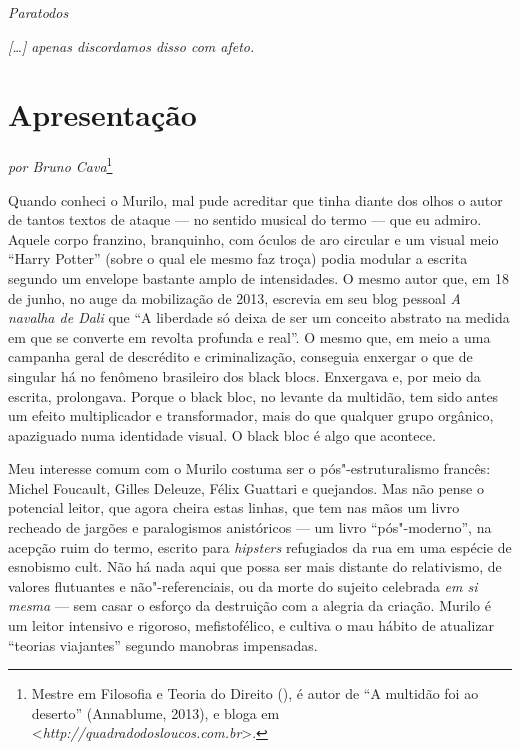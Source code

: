 \pagebreak

\vspace*{\fill}\thispagestyle{empty}
\begin{flushright}
\emph{Paratodos}
\end{flushright}
\pagebreak

\vspace*{\fill}\thispagestyle{empty}
\begin{flushright}
\emph{{[}\ldots{}{]} apenas discordamos disso com afeto.}
\end{flushright}

\chapter{Apresentação}

\begin{flushright}
\emph{por Bruno Cava}\footnote{Mestre em Filosofia e Teoria do Direito (), é autor de ``A multidão foi ao deserto'' (Annablume, 2013), e bloga em \textless{}\emph{http://quadradodosloucos.com.br}\textgreater{}.}
\end{flushright}

Quando conheci o Murilo, mal pude acreditar que tinha diante
dos olhos o autor de tantos textos de ataque --- no sentido musical do
termo --- que eu admiro. Aquele corpo franzino, branquinho, com óculos de
aro circular e um visual meio ``Harry Potter'' (sobre o qual ele mesmo faz
troça) podia modular a escrita segundo um envelope bastante amplo de
intensidades. O mesmo autor que, em 18 de junho, no auge da
mobilização de 2013, escrevia em seu blog pessoal \emph{A navalha de
Dali} que ``A liberdade só deixa de ser um conceito abstrato na medida em
que se converte em revolta profunda e real''. O mesmo que, em meio a uma
campanha geral de descrédito e criminalização, conseguia enxergar o que
de singular há no fenômeno brasileiro dos black blocs. Enxergava e, por
meio da escrita, prolongava. Porque o black bloc, no levante da
multidão, tem sido antes um efeito multiplicador e transformador, mais do que
qualquer grupo orgânico, apaziguado numa identidade visual. O black bloc
é algo que acontece.

Meu interesse comum com o Murilo costuma ser o pós"-estruturalismo
francês: Michel Foucault, Gilles Deleuze, Félix Guattari e quejandos.
Mas não pense o potencial leitor, que agora cheira estas linhas, que tem
nas mãos um livro recheado de jargões e paralogismos anistóricos --- um
livro ``pós"-moderno'', na acepção ruim do termo, escrito para
\emph{hipsters} refugiados da rua em uma espécie de esnobismo cult. Não há nada
aqui que possa ser mais distante do relativismo, de valores flutuantes e
não"-referenciais, ou da morte do sujeito celebrada \emph{em si mesma} ---
sem casar o esforço da destruição com a alegria da criação. Murilo é um
leitor intensivo e rigoroso, mefistofélico, e cultiva o mau hábito de
atualizar ``teorias viajantes'' segundo manobras impensadas.

